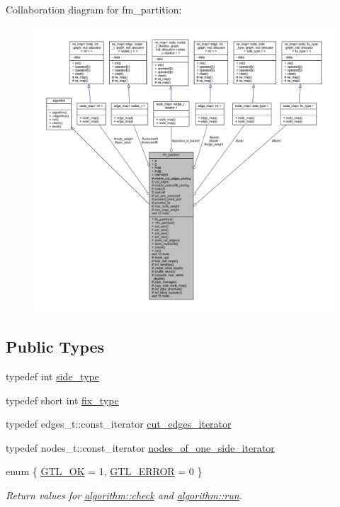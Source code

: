Collaboration diagram for fm\+\_\+partition\+:\nopagebreak
\begin{figure}[H]
\begin{center}
\leavevmode
\includegraphics[width=350pt]{classfm__partition__coll__graph}
\end{center}
\end{figure}
\subsection*{Public Types}
\begin{DoxyCompactItemize}
\item 
typedef int \mbox{\hyperlink{classfm__partition_a7cdff1bea3740a287387e8408e16ca79}{side\+\_\+type}}
\item 
typedef short int \mbox{\hyperlink{classfm__partition_a63693cd93d587dca3d1842f831cd1c55}{fix\+\_\+type}}
\item 
typedef edges\+\_\+t\+::const\+\_\+iterator \mbox{\hyperlink{classfm__partition_a15e854cf1efcae91d05a48f2a9fd0761}{cut\+\_\+edges\+\_\+iterator}}
\item 
typedef nodes\+\_\+t\+::const\+\_\+iterator \mbox{\hyperlink{classfm__partition_ad6cca73d48cc73d7bee1f52bf1c9a9fe}{nodes\+\_\+of\+\_\+one\+\_\+side\+\_\+iterator}}
\item 
enum \{ \mbox{\hyperlink{classalgorithm_af1a0078e153aa99c24f9bdf0d97f6710a5114c20e4a96a76b5de9f28bf15e282b}{G\+T\+L\+\_\+\+OK}} = 1, 
\mbox{\hyperlink{classalgorithm_af1a0078e153aa99c24f9bdf0d97f6710a6fcf574690bbd6cf710837a169510dd7}{G\+T\+L\+\_\+\+E\+R\+R\+OR}} = 0
 \}
\begin{DoxyCompactList}\small\item\em Return values for \mbox{\hyperlink{classalgorithm_a76361fb03ad1cf643affc51821e43bed}{algorithm\+::check}} and \mbox{\hyperlink{classalgorithm_a734b189509a8d6b56b65f8ff772d43ca}{algorithm\+::run}}. \end{DoxyCompactList}\end{DoxyCompactItemize}
